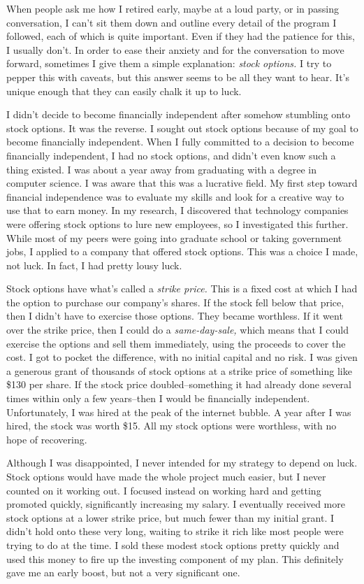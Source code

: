When people ask me how I retired early, maybe at a loud party, or in passing conversation, I can't sit them down and outline every detail of the program I followed, each of which is quite important. Even if they had the patience for this, I usually don't. In order to ease their anxiety and for the conversation to move forward, sometimes I give them a simple explanation: \emph{stock options.} I try to pepper this with caveats, but this answer seems to be all they want to hear. It's unique enough that they can easily chalk it up to luck.

I didn't decide to become financially independent after somehow stumbling onto stock options. It was the reverse. I sought out stock options because of my goal to become financially independent. When I fully committed to a decision to become financially independent, I had no stock options, and didn't even know such a thing existed. I was about a year away from graduating with a degree in computer science. I was aware that this was a lucrative field. My first step toward financial independence was to evaluate my skills and look for a creative way to use that to earn money. In my research, I discovered that technology companies were offering stock options to lure new employees, so I investigated this further. While most of my peers were going into graduate school or taking government jobs, I applied to a company that offered stock options. This was a choice I made, not luck. In fact, I had pretty lousy luck.

Stock options have what's called a \emph{strike price.} This is a fixed cost at which I had the option to purchase our company's shares. If the stock fell below that price, then I didn't have to exercise those options. They became worthless. If it went over the strike price, then I could do a \emph{same-day-sale,} which means that I could exercise the options and sell them immediately, using the proceeds to cover the cost. I got to pocket the difference, with no initial capital and no risk. I was given a generous grant of thousands of stock options at a strike price of something like \$130 per share. If the stock price doubled–something it had already done several times within only a few years–then I would be financially independent. Unfortunately, I was hired at the peak of the internet bubble. A year after I was hired, the stock was worth \$15. All my stock options were worthless, with no hope of recovering.

Although I was disappointed, I never intended for my strategy to depend on luck. Stock options would have made the whole project much easier, but I never counted on it working out. I focused instead on working hard and getting promoted quickly, significantly increasing my salary. I eventually received more stock options at a lower strike price, but much fewer than my initial grant. I didn't hold onto these very long, waiting to strike it rich like most people were trying to do at the time. I sold these modest stock options pretty quickly and used this money to fire up the investing component of my plan. This definitely gave me an early boost, but not a very significant one.

